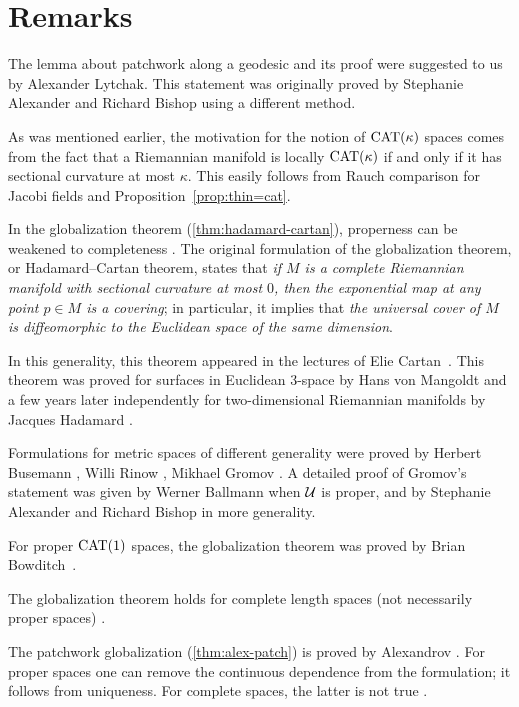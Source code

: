 \section{Remarks}

The lemma about patchwork along a geodesic and its proof were suggested to us by Alexander Lytchak.  
This statement was originally proved by Stephanie Alexander and Richard Bishop \cite{alexander-bishop-1990} using a different method.

As was mentioned earlier, the motivation for the notion of $\mathrm{CAT}(\kappa)$ spaces comes from the fact that a Riemannian manifold is locally  $\mathrm{CAT}(\kappa)$ if and only if it has sectional curvature at most $\kappa$.
This easily follows from Rauch comparison for Jacobi fields and Proposition~\ref{prop:thin=cat}.

In the globalization theorem (\ref{thm:hadamard-cartan}), properness can be weakened to completeness \cite[see][and the references therein]{alexander-kapovitch-petrunin-2025}.
The original formulation of the globalization theorem, or 
Hadamard--Cartan theorem, states that \textit{if $M$ is a complete Riemannian manifold with sectional curvature at most $0$,  
then the exponential map at any point $p\in M$ is a covering};
in particular, it implies that \textit{the universal cover of $M$ is diffeomorphic to the Euclidean space of the same dimension}.

In this generality, this theorem appeared in the lectures of Elie Cartan~\cite{cartan}.
This theorem was proved for surfaces in Euclidean $3$-space 
by Hans von Mangoldt \cite{mangoldt}
and a few years later independently for two-dimensional Riemannian manifolds by Jacques Hadamard \cite{hadamard}.

Formulations for metric spaces of different generality were proved by 
Herbert Busemann \cite{busemann-CBA},
Willi Rinow \cite{rinow},
Mikhael Gromov \cite[p.~119]{gromov-1987}. 
A detailed proof of Gromov's statement was given by Werner Ballmann \cite{ballmann-1995} when $\mathcal{U}$ is proper,
and by Stephanie Alexander and Richard Bishop \cite{alexander-bishop-1990} in more generality.

For proper $\mathrm{CAT}(1)$ spaces, the globalization theorem was proved by Brian Bowditch~\cite{bowditch}.

The globalization theorem holds for complete length spaces (not necessarily proper spaces) \cite{alexander-kapovitch-petrunin-2025}.


The patchwork globalization (\ref{thm:alex-patch}) is proved by Alexandrov \cite[Satz 9]{alexandrov-1957}.
For proper spaces one can remove the continuous dependence from the formulation; it follows from uniqueness.
For complete spaces, the latter is not true \cite[Chapter I, Exercise 3.14]{bridson-haefliger}.
